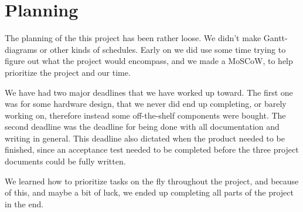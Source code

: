 \chapter{Planning}
The planning of the this project has been rather loose. We didn't make  Gantt-diagrams or other kinds of schedules. Early on we did use some time trying to figure out what the project would encompass, and we made a MoSCoW, to help prioritize the project and our time.

We have had two major deadlines that we have worked up toward. The first one was for some hardware design, that we never did end up completing, or barely working on, therefore instead some off-the-shelf components were bought. The second deadline was the deadline for being done with all documentation and writing in general. This deadline also dictated when the product needed to be finished, since an acceptance test needed to be completed before the three project documents could be fully written. 

We learned how to prioritize tasks on the fly throughout the project, and because of this, and maybe a bit of luck, we ended up completing all parts of the project in the end.